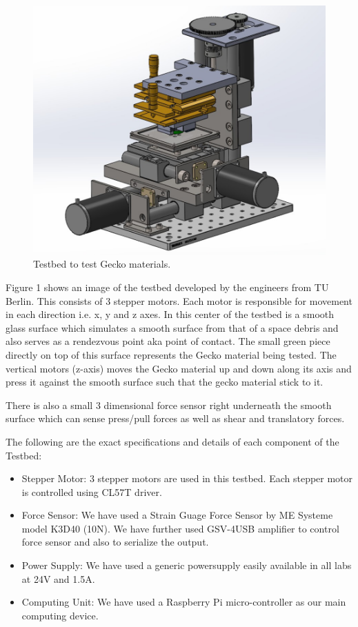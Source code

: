 \documentclass[
    twocolumn,
    fontsize = 10pt,
    parskip = half+,
    headings = small,
    headwidth = text,
    footwidth = text,
]{scrartcl}
\begin{document}
\begin{figure}[h]
    \centering
    \includegraphics[width=1.0\linewidth]{pics/gecko_testbed.png}
    \caption{Testbed to test Gecko materials.}
    \label{fig: gecko testbed}
\end{figure}

Figure 1 shows an image of the testbed developed by the engineers from TU Berlin. This consists of 3 stepper motors. Each motor is responsible for movement in each direction i.e. x, y and z axes. In this center of the testbed is a smooth glass surface which simulates a smooth surface from that of a space debris and also serves as a rendezvous point aka point of contact. The small green piece directly on top of this surface represents the Gecko material being tested. The vertical motors (z-axis) moves the Gecko material up and down along its axis and press it against the smooth surface such that the gecko material stick to it.

There is also a small 3 dimensional force sensor right underneath the smooth surface which can sense press/pull forces as well as shear and translatory forces. 

The following are the exact specifications and details of each component of the Testbed:

\begin{itemize}
    \item Stepper Motor: 3 stepper motors are used in this testbed. Each stepper motor is controlled using CL57T driver.
    \item Force Sensor: We have used a Strain Guage Force Sensor by ME Systeme model K3D40 (10N). We have further used GSV-4USB amplifier to control force sensor and also to serialize the output.
    \item Power Supply: We have used a generic powersupply easily available in all labs at 24V and 1.5A.
    \item Computing Unit: We have used a Raspberry Pi micro-controller as our main computing device.
\end{itemize}
\end{document}
